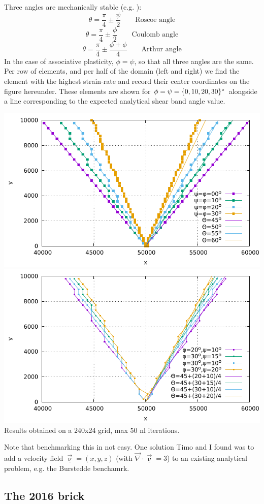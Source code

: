 Three angles are mechanically stable (e.g. \cite{kaus10}):
\[
\theta=\frac{\pi}{4}\pm \frac{\psi}{2} \qquad \text{Roscoe angle}
\]
\[
\theta=\frac{\pi}{4}\pm \frac{\phi}{2} \qquad \text{Coulomb angle}
\]
\[
\theta=\frac{\pi}{4}\pm \frac{\phi+\phi}{4} \qquad \text{Arthur angle}
\]
In the case of associative plasticity, $\phi=\psi$, so that all three angles are the same. 
Per row of elements, and per half of the domain (left and right) we find the element
with the highest strain-rate and record their center coordinates on the figure hereunder. 
These elements are shown for $\phi=\psi=\{0,10,20,30\}\degree$ alongside a line corresponding to 
the expected analytical shear band angle value.
\begin{center}
\includegraphics[width=.6\linewidth]{python_codes/fieldstone_39/images/shear_bands}\\
\includegraphics[width=.6\linewidth]{python_codes/fieldstone_39/images/shear_bands_nonass}\\
Results obtained on a 240x24 grid, max 50 nl iterations.
\end{center}



Note that benchmarking this in not easy. One solution Timo and I found was to add a 
velocity field $\underline{\vec\upnu}=(x,y,z)$ (with $\vec\nabla\cdot\underline{\vec\upnu}=3$)
to an existing analytical problem, e.g. the Burstedde benchamrk.

\subsection*{The 2016 brick}

